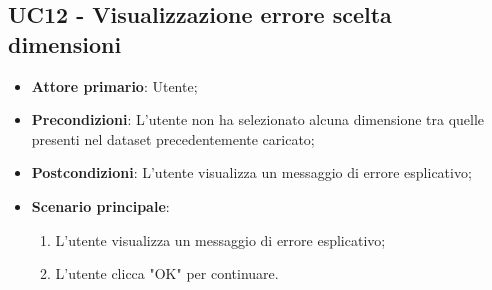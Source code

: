\subsection{UC12 - Visualizzazione errore scelta dimensioni}
\begin{itemize}
	\item \textbf{Attore primario}: Utente;
	\item \textbf{Precondizioni}: L'utente non ha selezionato alcuna dimensione tra quelle presenti nel dataset precedentemente caricato;
	\item \textbf{Postcondizioni}: L'utente visualizza un messaggio di errore esplicativo;
	\item \textbf{Scenario principale}:
		\begin{enumerate}
			\item L'utente visualizza un messaggio di errore esplicativo;
			\item L'utente clicca "OK" per continuare.
		\end{enumerate}
\end{itemize}